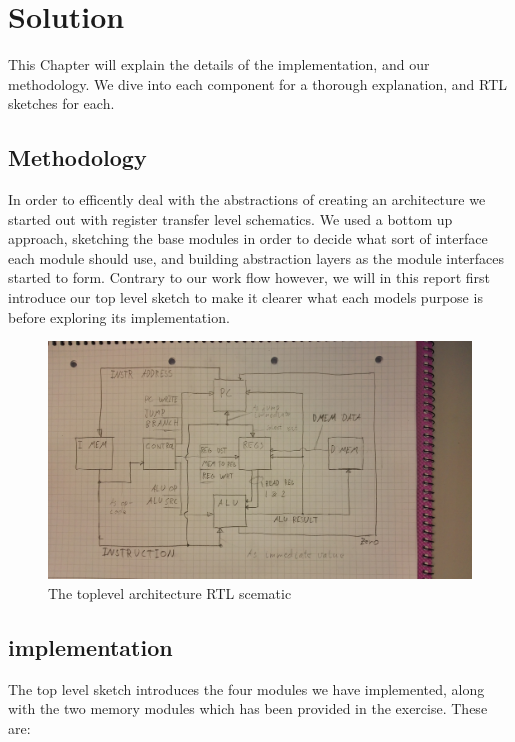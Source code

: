 \chapter{Solution}
This Chapter will explain the details of the implementation, and our methodology. We dive into each component for a thorough explanation, and RTL sketches for each.


\section{Methodology}

In order to efficently deal with the abstractions of creating an architecture we started out with register transfer level schematics. 
We used a bottom up approach, sketching the base modules in order to decide what sort of interface each module should use, and building abstraction layers as the module interfaces started to form.
Contrary to our work flow however, we will in this report first introduce our top level sketch to make it clearer what each models purpose is before exploring its implementation.

\begin{figure}[h!]
    \includegraphics[width=\linewidth]{img/toplevel.jpg}
    \caption{The toplevel architecture RTL scematic}
    \label{fig:toplevel}
\end{figure}

\section{implementation}
The top level sketch introduces the four modules we have implemented, along with the two memory modules which has been provided in the exercise.
These are:

